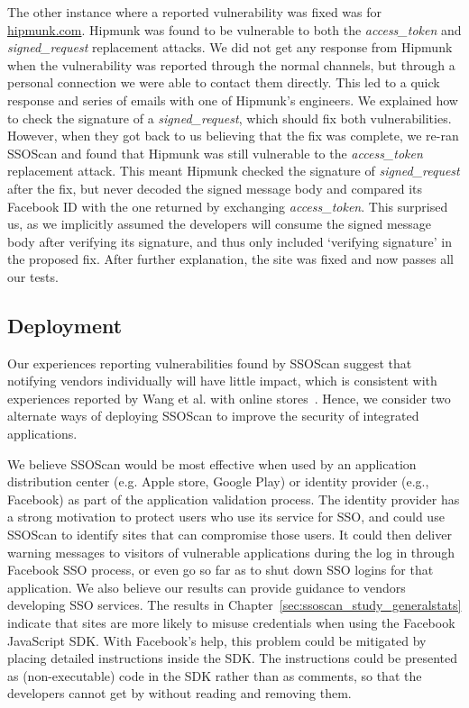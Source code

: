 The other instance where a reported vulnerability was fixed was for \url{hipmunk.com}.  Hipmunk was found to be vulnerable to both the \emph{access\_token} and \emph{signed\_request} replacement attacks.  We did not get any response from Hipmunk when the vulnerability was reported through the normal channels, but through a personal connection we were able to contact them directly.  This led to a quick response and series of emails with one of Hipmunk's engineers.  We explained how to check the signature of a \emph{signed\_request}, which should fix both vulnerabilities.  However, when they got back to us believing that the fix was complete, we re-ran SSOScan and found that Hipmunk was still vulnerable to the \emph{access\_token} replacement attack.  This meant Hipmunk checked the signature of \emph{signed\_request} after the fix, but never decoded the signed message body and compared its Facebook ID with the one returned by exchanging \emph{access\_token}.  This surprised us, as we implicitly assumed the developers will consume the signed message body after verifying its signature, and thus only included `verifying signature' in the proposed fix.  After further explanation, the site was fixed and now passes all our tests.

\subsection{Deployment}\label{sec:deployment}
Our experiences reporting vulnerabilities found by SSOScan suggest that notifying vendors individually will have little impact, which is consistent with experiences reported by Wang et al. with online stores~\cite{Wang:2011:SFO:2006077.2006782}.  Hence, we consider two alternate ways of deploying SSOScan to improve the security of integrated applications.

 We believe SSOScan would be most effective when used by an application distribution center (e.g. Apple store, Google Play) or identity provider (e.g., Facebook) as part of the application validation process.  The identity provider has a strong motivation to protect users who use its service for SSO, and could use SSOScan to identify sites that can compromise those users.  It could then deliver warning messages to visitors of vulnerable applications during the log in through Facebook SSO process, or even go so far as to shut down SSO logins for that application.  We also believe our results can provide guidance to vendors developing SSO services.  The results in Chapter~\ref{sec:ssoscan_study_generalstats} indicate that sites are more likely to misuse credentials when using the Facebook JavaScript SDK.  With Facebook's help, this problem could be mitigated by placing detailed instructions inside the SDK.  The instructions could be presented as (non-executable) code in the SDK rather than as comments, so that the developers cannot get by without reading and removing them.

